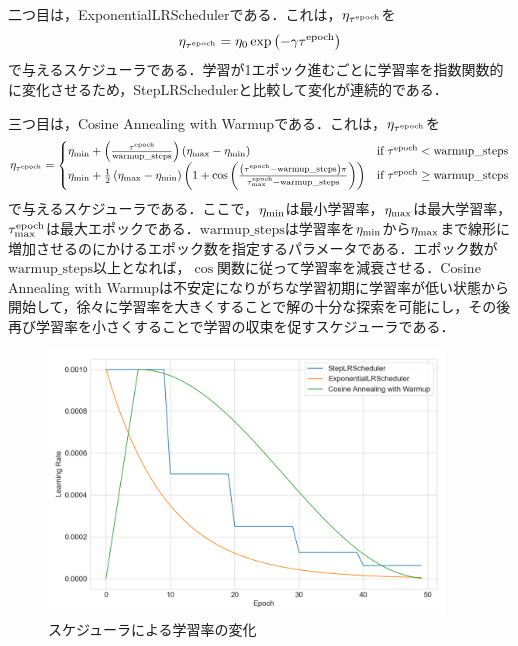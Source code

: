 \documentclass[12pt]{jarticle}
\numberwithin{equation}{section}    %
\numberwithin{figure}{section}      %
\numberwithin{table}{section}      %
\begin{document}
二つ目は，ExponentialLRSchedulerである．これは，$\eta_{\tau^{\text{epoch}}}$を
\begin{equation}
    \eta_{\tau^{\text{epoch}}} = \eta_{0} \exp \left( -\gamma \tau^{\text{epoch}} \right)
\end{equation}
で与えるスケジューラである．学習が1エポック進むごとに学習率を指数関数的に変化させるため，StepLRSchedulerと比較して変化が連続的である．

三つ目は，Cosine Annealing with Warmupである．これは，$\eta_{\tau^{\text{epoch}}}$を
\begin{equation}
    \eta_{\tau^{\text{epoch}}} =
    \begin{cases}
        \eta_{\text{min}} + \left( \frac{\tau^{\text{epoch}}}{\text{warmup\_steps}} \right) \left(\eta_{\text{max}} - \eta_{\text{min}}\right)                                                                                  & \text{if $\tau^{\text{epoch}} < \text{warmup\_steps}$}   \\
        \eta_{\text{min}} + \frac{1}{2} \left(\eta_{\text{max}} - \eta_{\text{min}}\right) \left( 1 + \cos \left( \frac{\left(\tau^{\text{epoch}} - \text{warmup\_steps}\right)\pi}{\tau^{\text{epoch}}_{\text{max}} - \text{warmup\_steps}} \right) \right) & \text{if $\tau^{\text{epoch}} \ge \text{warmup\_steps}$}
    \end{cases}
\end{equation}
で与えるスケジューラである．ここで，$\eta_{\text{min}}$は最小学習率，$\eta_{\text{max}}$は最大学習率，$\tau^{\text{epoch}}_{\text{max}}$は最大エポックである．$\text{warmup\_steps}$は学習率を$\eta_{\text{min}}$から$\eta_{\text{max}}$まで線形に増加させるのにかけるエポック数を指定するパラメータである．エポック数が$\text{warmup\_steps}$以上となれば，$\cos$関数に従って学習率を減衰させる．Cosine Annealing with Warmupは不安定になりがちな学習初期に学習率が低い状態から開始して，徐々に学習率を大きくすることで解の十分な探索を可能にし，その後再び学習率を小さくすることで学習の収束を促すスケジューラである．

\begin{figure}[bt]
    \centering
    \includegraphics[height=70mm]{./figure/sec3/lr_scheduler.png}
    \caption{スケジューラによる学習率の変化}
    \label{sec3:fig:lr_scheduler}
\end{figure}
\end{document}
